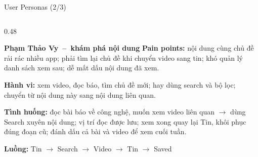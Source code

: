 \documentclass[aspectratio=169]{beamer}
\begin{document}
\begin{frame}{User Personas (2/3)}
\begin{columns}
\begin{column}{0.48\textwidth}
\begin{block}{\scriptsize\bfseries Phạm Thảo Vy~--~khám phá nội dung}
        {\tiny\textbf{Pain points:} nội dung cùng chủ đề rải rác nhiều app; phải tìm lại chủ đề khi chuyển video sang tin; khó quản lý danh sách xem sau; dễ mất dấu nội dung đã xem.}\par\vspace{0.3mm}
        {\tiny\textbf{Hành vi:} xem video, đọc báo, tìm chủ đề mới; hay dùng search và bộ lọc; chuyển từ nội dung này sang nội dung liên quan.}\par\vspace{0.3mm}
        {\tiny\textbf{Tình huống:} đọc bài báo về công nghệ, muốn xem video liên quan $\rightarrow$ dùng Search xuyên nội dung; vị trí đọc được lưu; xem xong quay lại Tin, khôi phục đúng đoạn cũ; đánh dấu cả bài và video để xem cuối tuần.}\par\vspace{0.3mm}
        {\tiny\textbf{Luồng:} \textcolor{brandteal!60!black}{Tin $\rightarrow$ Search $\rightarrow$ Video $\rightarrow$ Tin $\rightarrow$ Saved}}
      \end{block}
    \end{column}
  \end{columns}
\end{frame}
\end{document}
